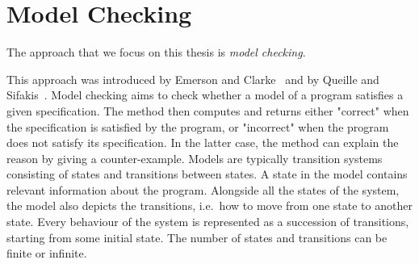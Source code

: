 \chapter{Model Checking}
\label{section:model:checking}
%
%
%

The approach that we focus on this thesis is
\emph{model checking}.
%
%

This approach was introduced by Emerson and Clarke~\cite{CE82} and by Queille and Sifakis~\cite{QS82}. 
Model checking aims to check whether a model of a program satisfies a given specification.
 The method then computes and returns either "correct" when the specification is satisfied by the program, or "incorrect" when the program does not satisfy its specification. In the latter case, the method can explain the reason by giving a counter-example.
Models are typically transition systems consisting of states and transitions between states.
A state in the model contains relevant information about the program.
Alongside all the states of the system, the model also depicts the
transitions, i.e.\ how to move from one state to another state. Every behaviour of the system is represented as a succession of transitions, starting from some initial state.
The number of states and transitions can be finite or infinite.
